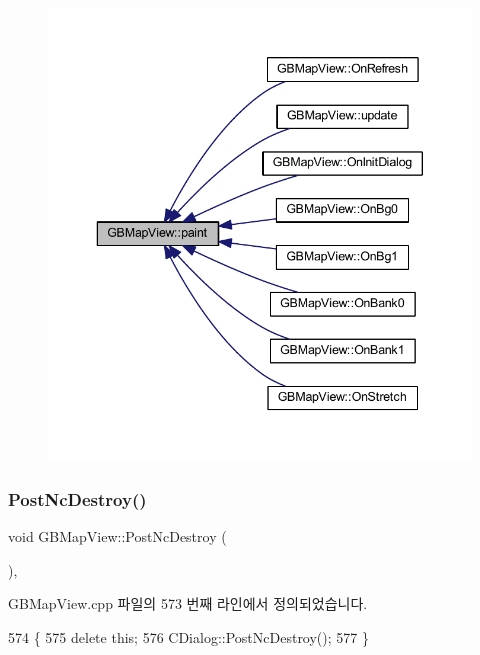 \begin{figure}[H]
\begin{center}
\leavevmode
\includegraphics[width=343pt]{class_g_b_map_view_a42de669273417186b01ca6f8d06eb347_icgraph}
\end{center}
\end{figure}
\mbox{\label{class_g_b_map_view_ac613a0601eb7bea0ca757dda85011b73}} 
\subsubsection{\texorpdfstring{Post\+Nc\+Destroy()}{PostNcDestroy()}}
{\footnotesize\ttfamily void G\+B\+Map\+View\+::\+Post\+Nc\+Destroy (\begin{DoxyParamCaption}{ }\end{DoxyParamCaption})\hspace{0.3cm}{\ttfamily [protected]}, {\ttfamily [virtual]}}



G\+B\+Map\+View.\+cpp 파일의 573 번째 라인에서 정의되었습니다.


\begin{DoxyCode}
574 \{
575   \textcolor{keyword}{delete} \textcolor{keyword}{this};
576   CDialog::PostNcDestroy();
577 \}
\end{DoxyCode}
\mbox{\label{class_g_b_map_view_a48aeac68f689682206749e933513b98e}} 
